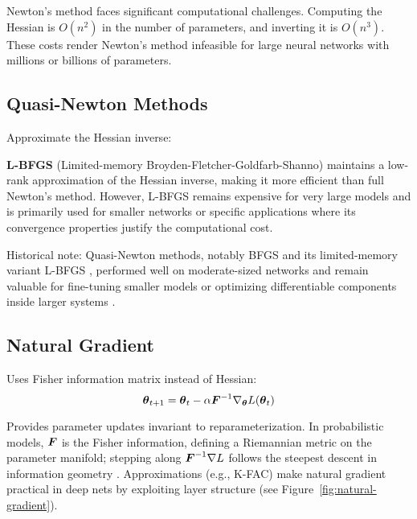 Newton's method faces significant computational challenges. Computing the Hessian is $O(n^2)$ in the number of parameters, and inverting it is $O(n^3)$. These costs render Newton's method infeasible for large neural networks with millions or billions of parameters.

\subsection{Quasi-Newton Methods}

Approximate the Hessian inverse:

\textbf{L-BFGS} (Limited-memory Broyden-Fletcher-Goldfarb-Shanno) maintains a low-rank approximation of the Hessian inverse, making it more efficient than full Newton's method. However, L-BFGS remains expensive for very large models and is primarily used for smaller networks or specific applications where its convergence properties justify the computational cost.

Historical note: Quasi-Newton methods, notably BFGS and its limited-memory variant L-BFGS \cite{LiuNocedal1989}, performed well on moderate-sized networks and remain valuable for fine-tuning smaller models or optimizing differentiable components inside larger systems \cite{GoodfellowEtAl2016,Bishop2006}.

\subsection{Natural Gradient}

Uses Fisher information matrix instead of Hessian:
\begin{equation}
\boldsymbol{\theta}_{t+1} = \boldsymbol{\theta}_t - \alpha \boldsymbol{F}^{-1} \nabla_{\boldsymbol{\theta}} L(\boldsymbol{\theta}_t)
\end{equation}

Provides parameter updates invariant to reparameterization. In probabilistic models, \(\boldsymbol{F}\) is the Fisher information, defining a Riemannian metric on the parameter manifold; stepping along \(\boldsymbol{F}^{-1}\nabla L\) follows the steepest descent in information geometry \cite{Amari1998}. Approximations (e.g., K-FAC) make natural gradient practical in deep nets by exploiting layer structure (see Figure~\ref{fig:natural-gradient}).

